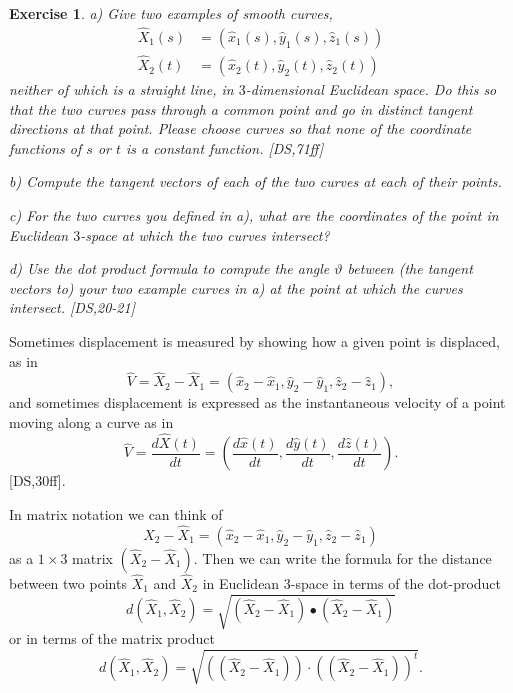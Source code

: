 \documentclass{article}%
\newtheorem{exercise}[theorem]{Exercise}
\begin{document}
\begin{exercise}
\label{1}a) Give two examples of smooth curves,
\begin{align*}
\hat{X}_{1}\left(  s\right)   &  =\left(  \hat{x}_{1}\left(  s\right)
,\hat{y}_{1}\left(  s\right)  ,\hat{z}_{1}\left(  s\right)  \right) \\
\hat{X}_{2}\left(  t\right)   &  =\left(  \hat{x}_{2}\left(  t\right)
,\hat{y}_{2}\left(  t\right)  ,\hat{z}_{2}\left(  t\right)  \right)
\end{align*}
neither of which is a straight line, in $3$-dimensional Euclidean space. Do
this so that the two curves pass through a common point and go in distinct
tangent directions at that point. Please choose curves so that none of the
coordinate functions of $s$ or $t$ is a constant function. [DS,71ff]

b) Compute the tangent vectors of each of the two curves at each of their points.

c) For the two curves you defined in a), what are the coordinates of the point
in Euclidean $3$-space at which the two curves intersect?

d) Use the dot product formula to compute the angle $\vartheta$ between (the
tangent vectors to) your two example curves in a) at the point at which the
curves intersect. [DS,20-21]
\end{exercise}

Sometimes displacement is measured by showing how a given point is displaced,
as in%
\[
\hat{V}=\hat{X}_{2}-\hat{X}_{1}=\left(  \hat{x}_{2}-\hat{x}_{1},\hat{y}%
_{2}-\hat{y}_{1},\hat{z}_{2}-\hat{z}_{1}\right)  ,
\]
and sometimes displacement is expressed as the instantaneous velocity of a
point moving along a curve as in%
\[
\hat{V}=\frac{d\hat{X}\left(  t\right)  }{dt}=\left(  \frac{d\hat{x}\left(
t\right)  }{dt},\frac{d\hat{y}\left(  t\right)  }{dt},\frac{d\hat{z}\left(
t\right)  }{dt}\right)  .
\]
[DS,30ff].

In matrix notation we can think of
\[
\hat{X}_{2}-\hat{X}_{1}=\left(  \hat{x}_{2}-\hat{x}_{1},\hat{y}_{2}-\hat
{y}_{1},\hat{z}_{2}-\hat{z}_{1}\right)
\]
as a $1\times3$ matrix $\left(  \hat{X}_{2}-\hat{X}_{1}\right)  $. Then we can
write the formula for the distance between two points $\hat{X}_{1}$ and
$\hat{X}_{2}$ in Euclidean $3$-space in terms of the dot-product%
\begin{equation}
d\left(  \hat{X}_{1},\hat{X}_{2}\right)  =\sqrt{\left(  \hat{X}_{2}-\hat
{X}_{1}\right)  \bullet\left(  \hat{X}_{2}-\hat{X}_{1}\right)  } \label{13}%
\end{equation}
or in terms of the matrix product%
\[
d\left(  \hat{X}_{1},\hat{X}_{2}\right)  =\sqrt{\left(  \left(  \hat{X}%
_{2}-\hat{X}_{1}\right)  \right)  \cdot\left(  \left(  \hat{X}_{2}-\hat{X}%
_{1}\right)  \right)  ^{t}}.
\]
\newpage
\end{document}
